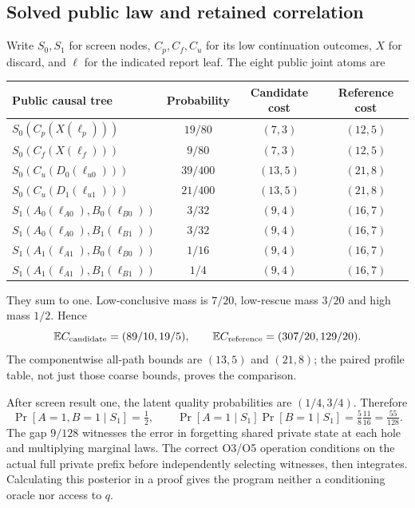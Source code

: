 \subsection{Solved public law and retained correlation}
Write $S_0,S_1$ for screen nodes, $C_p,C_f,C_u$ for its low continuation
outcomes, $X$ for discard, and $\ell$ for the indicated report leaf.
The eight public joint atoms are
\begin{center}\small
\begin{tabular}{@{}lccc@{}}
\toprule Public causal tree&Probability&Candidate cost&Reference cost\\\midrule
$S_0(C_p(X(\ell_p)))$&$19/80$&$(7,3)$&$(12,5)$\\
$S_0(C_f(X(\ell_f)))$&$9/80$&$(7,3)$&$(12,5)$\\
$S_0(C_u(D_0(\ell_{u0})))$&$39/400$&$(13,5)$&$(21,8)$\\
$S_0(C_u(D_1(\ell_{u1})))$&$21/400$&$(13,5)$&$(21,8)$\\
$S_1(A_0(\ell_{A0}),B_0(\ell_{B0}))$&$3/32$&$(9,4)$&$(16,7)$\\
$S_1(A_0(\ell_{A0}),B_1(\ell_{B1}))$&$3/32$&$(9,4)$&$(16,7)$\\
$S_1(A_1(\ell_{A1}),B_0(\ell_{B0}))$&$1/16$&$(9,4)$&$(16,7)$\\
$S_1(A_1(\ell_{A1}),B_1(\ell_{B1}))$&$1/4$&$(9,4)$&$(16,7)$\\
\bottomrule
\end{tabular}
\end{center}
They sum to one. Low-conclusive mass is $7/20$, low-rescue mass $3/20$
and high mass $1/2$. Hence
\[
\mathbb E C_{\rm candidate}=(89/10,19/5),\qquad
\mathbb E C_{\rm reference}=(307/20,129/20).
\]
The componentwise all-path bounds are $(13,5)$ and $(21,8)$; the paired
profile table, not just those coarse bounds, proves the comparison.

After screen result one, the latent quality probabilities are
$(1/4,3/4)$. Therefore
\[
\Pr[A=1,B=1\mid S_1]=\tfrac12,
\qquad
\Pr[A=1\mid S_1]\Pr[B=1\mid S_1]
=\tfrac58\tfrac{11}{16}=\tfrac{55}{128}.
\]
The gap $9/128$ witnesses the error in forgetting shared private state
at each hole and multiplying marginal laws. The correct O3/O5 operation
conditions on the actual full private prefix before independently
selecting witnesses, then integrates. Calculating this posterior in a
proof gives the program neither a conditioning oracle nor access to $q$.

